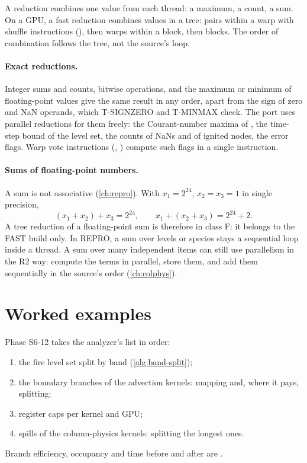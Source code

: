 A reduction combines one value from each thread: a maximum, a count, a sum. On a GPU, a fast reduction combines
values in a tree: pairs within a warp with shuffle instructions (), then warps within a block, then
blocks. The order of combination follows the tree, not the source's loop.

\paragraph{Exact reductions.} Integer sums and counts, bitwise operations, and the maximum or minimum of
floating-point values give the same result in any order, apart from the sign of zero and NaN operands, which T-SIGNZERO
and T-MINMAX check. The port uses parallel reductions for them freely: the Courant-number maxima of , the
time-step bound of the level set, the counts of NaNs and of ignited nodes, the error flags. Warp vote instructions
(, ) compute such flags in a single instruction.

\paragraph{Sums of floating-point numbers.} A sum is not associative (\cref{ch:repro}). With $x_1 = 2^{24}$,
$x_2 = x_3 = 1$ in single precision,
\begin{equation}
  (x_1 + x_2) + x_3 = 2^{24}, \qquad x_1 + (x_2 + x_3) = 2^{24} + 2 .
\end{equation}
A tree reduction of a floating-point sum is therefore in class F: it belongs to the FAST build only. In REPRO, a sum
over levels or species stays a sequential loop inside a thread. A sum over many independent items can still use
parallelism in the R2 way: compute the terms in parallel, store them, and add them sequentially in the source's order
(\cref{ch:colphys}).

\section{Worked examples}

Phase S6-12 takes the analyzer's list in order:
\begin{enumerate}
  \item the fire level set split by band (\cref{alg:band-split});
  \item the boundary branches of the advection kernels: mapping and, where it pays, splitting;
  \item register caps per kernel and GPU;
  \item spills of the column-physics kernels: splitting the longest ones.
\end{enumerate}
Branch efficiency, occupancy and time before and after are \tbr.
